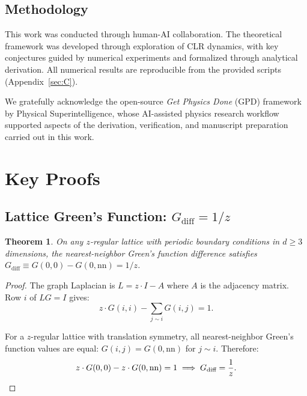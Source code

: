 \documentclass[aps,prd,onecolumn,superscriptaddress,floatfix,12pt]{revtex4-2}
\newcommand{\Gdiff}{G_{\text{diff}}}
\newtheorem{theorem}{Theorem}[section]
\begin{document}
\subsection{Methodology}\label{sec:8-4}

This work was conducted through human-AI collaboration. The theoretical framework was developed through exploration of CLR dynamics, with key conjectures guided by numerical experiments and formalized through analytical derivation. All numerical results are reproducible from the provided scripts (Appendix~\ref{sec:C}).

\begin{acknowledgments}
We gratefully acknowledge the open-source \emph{Get Physics Done} (GPD) framework by Physical Superintelligence, whose AI-assisted physics research workflow supported aspects of the derivation, verification, and manuscript preparation carried out in this work.
\end{acknowledgments}

\appendix

\section{Key Proofs}\label{sec:A}

\subsection{Lattice Green's Function: $\Gdiff = 1/z$}\label{sec:A1}

\begin{theorem}\label{thm:greens}
On any $z$-regular lattice with periodic boundary conditions in $d \geq 3$ dimensions, the nearest-neighbor Green's function difference satisfies $\Gdiff \equiv G(0,0) - G(0, \text{nn}) = 1/z$.
\end{theorem}

\begin{proof}
The graph Laplacian is $L = z \cdot I - A$ where $A$ is the adjacency matrix. Row $i$ of $LG = I$ gives:
\[
z \cdot G(i,i) - \sum_{j \sim i} G(i,j) = 1.
\]

For a $z$-regular lattice with translation symmetry, all nearest-neighbor Green's function values are equal: $G(i,j) = G(0, \text{nn})$ for $j \sim i$. Therefore:
\[
z \cdot G(0,0) - z \cdot G(0, \text{nn}) = 1 \implies \Gdiff = \frac{1}{z}.  \qedhere
\]
\end{proof}
\end{document}

